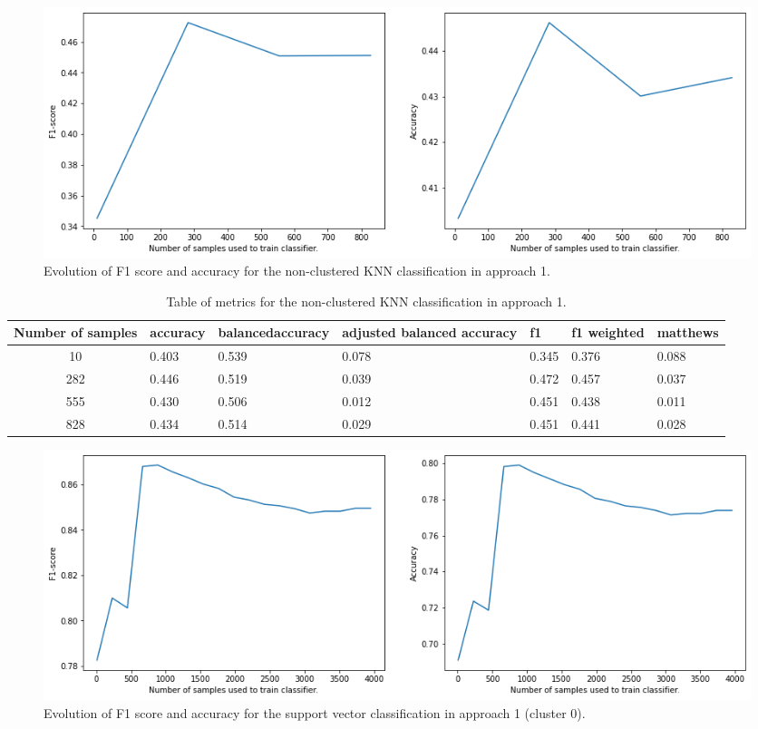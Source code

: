 \documentclass[sigplan,screen]{acmart}
\begin{document}
\begin{figure}[h]
    \centering
    \includegraphics[width=\linewidth]{reports/figures/A1_classification_knn_nocluster.png}
    \caption{Evolution of F1 score and accuracy for the non-clustered KNN classification in approach 1.}
    \label{fig:A1_classification_knn_nocluster}
\end{figure}

\begin{table}[h]
  \caption{Table of metrics for the non-clustered KNN classification in approach 1.}
  \label{tab:A1_classification_knn_nocluster}
  \begin{tabular}{cllllll}
    \toprule
    Number of samples & accuracy & balancedaccuracy & adjusted balanced accuracy & f1 & f1 weighted & matthews\\
    \midrule
       10 & 0.403 & 0.539 & 0.078 & 0.345 & 0.376 & 0.088\\
      282 & 0.446 & 0.519 & 0.039 & 0.472 & 0.457 & 0.037\\
      555 & 0.430 & 0.506 & 0.012 & 0.451 & 0.438 & 0.011\\
      828 & 0.434 & 0.514 & 0.029 & 0.451 & 0.441 & 0.028\\
    \bottomrule
    \end{tabular}
\end{table}

\begin{figure}[h]
    \centering
    \includegraphics[width=\linewidth]{reports/figures/A1_classification_svc_cluster0.png}
    \caption{Evolution of F1 score and accuracy for the support vector classification in approach 1 (cluster 0).}
    \label{fig:A1_classification_svc_cluster0}
\end{figure}
\end{document}
